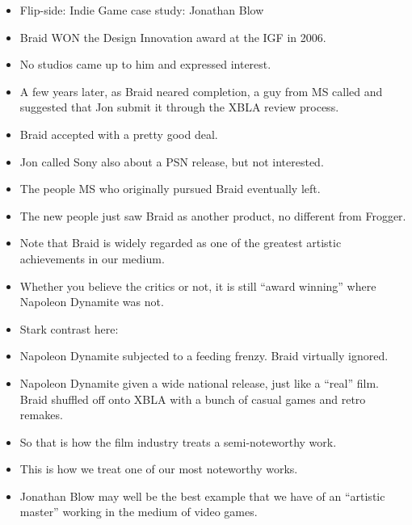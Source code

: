 \documentclass[12pt]{article}
\begin{document}
{\begin{itemize}
\item Flip-side:  Indie Game case study:  Jonathan Blow

\item Braid WON the Design Innovation award at the IGF in 2006.

\item No studios came up to him and expressed interest.

\item A few years later, as Braid neared completion, a guy from MS called and suggested that Jon submit it through the XBLA review process.

\item Braid accepted with a pretty good deal.

\item Jon called Sony also about a PSN release, but not interested.

\item The people MS who originally pursued Braid eventually left.

\item The new people just saw Braid as another product, no different from Frogger.

\item Note that Braid is widely regarded as one of the greatest artistic achievements in our medium.

\item Whether you believe the critics or not, it is still ``award winning'' where Napoleon Dynamite was not.

\item Stark contrast here:

\item Napoleon Dynamite subjected to a feeding frenzy.  Braid virtually ignored.

\item Napoleon Dynamite given a wide national release, just like a ``real'' film.  Braid shuffled off onto XBLA with a bunch of casual games and retro remakes.

\item So that is how the film industry treats a semi-noteworthy work.

\item This is how we treat one of our most noteworthy works.

\item Jonathan Blow may well be the best example that we have of an ``artistic master'' working in the medium of video games.


\end{itemize}}
\end{document}
